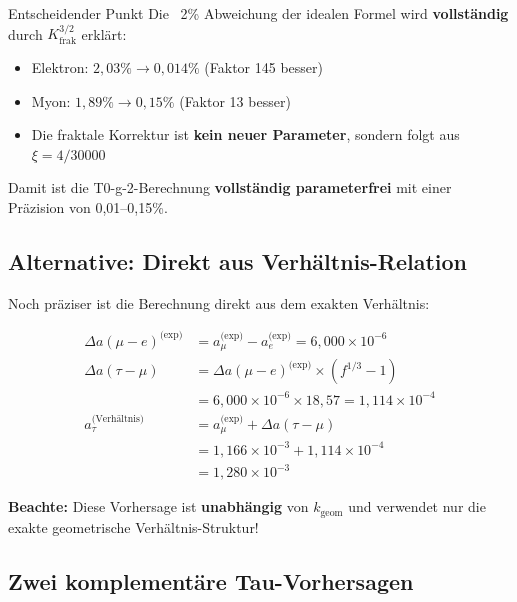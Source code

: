 	\begin{important}{Entscheidender Punkt}
		Die ~2\% Abweichung der idealen Formel wird \textbf{vollständig} durch $K_\text{frak}^{3/2}$ erklärt:
		\begin{itemize}
			\item Elektron: $2{,}03\% \to 0{,}014\%$ (Faktor 145 besser)
			\item Myon: $1{,}89\% \to 0{,}15\%$ (Faktor 13 besser)
			\item Die fraktale Korrektur ist \textbf{kein neuer Parameter}, sondern folgt aus $\xi = 4/30000$
		\end{itemize}
		
		Damit ist die T0-g-2-Berechnung \textbf{vollständig parameterfrei} mit einer Präzision von 0{,}01--0{,}15\%.
	\end{important}
	
	\subsection{Alternative: Direkt aus Verhältnis-Relation}
	
	Noch präziser ist die Berechnung direkt aus dem exakten Verhältnis:
	
	\begin{align}
		\Delta a(\mu-e)^{\text{(exp)}} &= a_\mu^{\text{(exp)}} - a_e^{\text{(exp)}} = 6{,}000 \times 10^{-6} \\
		\Delta a(\tau-\mu) &= \Delta a(\mu-e)^{\text{(exp)}} \times (f^{1/3} - 1) \\
		&= 6{,}000 \times 10^{-6} \times 18{,}57 = 1{,}114 \times 10^{-4} \\
		a_\tau^{\text{(Verhältnis)}} &= a_\mu^{\text{(exp)}} + \Delta a(\tau-\mu) \\
		&= 1{,}166 \times 10^{-3} + 1{,}114 \times 10^{-4} \\
		&= \boxed{1{,}280 \times 10^{-3}}
	\end{align}
	
	\textbf{Beachte:} Diese Vorhersage ist \textbf{unabhängig} von $k_{\text{geom}}$ und verwendet nur die exakte geometrische Verhältnis-Struktur!
	
	\subsection{Zwei komplementäre Tau-Vorhersagen}
	
